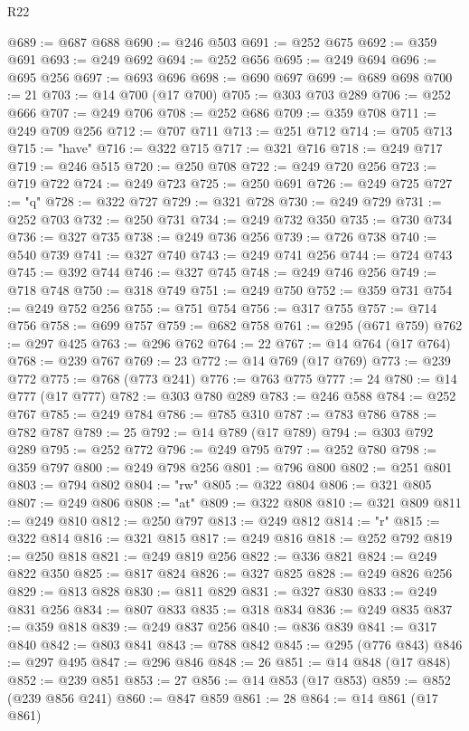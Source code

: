\begin{lexlean}{R22}
\begin{coremodule}
@689 := @687 @688
@690 := @246 @503
@691 := @252 @675
@692 := @359 @691
@693 := @249 @692
@694 := @252 @656
@695 := @249 @694
@696 := @695 @256
@697 := @693 @696
@698 := @690 @697
@699 := @689 @698
@700 := 21
@703 := @14 @700 (@17 @700)
@705 := @303 @703 @289
@706 := @252 @666
@707 := @249 @706
@708 := @252 @686
@709 := @359 @708
@711 := @249 @709 @256
@712 := @707 @711
@713 := @251 @712
@714 := @705 @713
@715 := "have"
@716 := @322 @715
@717 := @321 @716
@718 := @249 @717
@719 := @246 @515
@720 := @250 @708
@722 := @249 @720 @256
@723 := @719 @722
@724 := @249 @723
@725 := @250 @691
@726 := @249 @725
@727 := "q"
@728 := @322 @727
@729 := @321 @728
@730 := @249 @729
@731 := @252 @703
@732 := @250 @731
@734 := @249 @732 @350
@735 := @730 @734
@736 := @327 @735
@738 := @249 @736 @256
@739 := @726 @738
@740 := @540 @739
@741 := @327 @740
@743 := @249 @741 @256
@744 := @724 @743
@745 := @392 @744
@746 := @327 @745
@748 := @249 @746 @256
@749 := @718 @748
@750 := @318 @749
@751 := @249 @750
@752 := @359 @731
@754 := @249 @752 @256
@755 := @751 @754
@756 := @317 @755
@757 := @714 @756
@758 := @699 @757
@759 := @682 @758
@761 := @295 (@671 @759)
@762 := @297 @425
@763 := @296 @762
@764 := 22
@767 := @14 @764 (@17 @764)
@768 := @239 @767
@769 := 23
@772 := @14 @769 (@17 @769)
@773 := @239 @772
@775 := @768 (@773 @241)
@776 := @763 @775
@777 := 24
@780 := @14 @777 (@17 @777)
@782 := @303 @780 @289
@783 := @246 @588
@784 := @252 @767
@785 := @249 @784
@786 := @785 @310
@787 := @783 @786
@788 := @782 @787
@789 := 25
@792 := @14 @789 (@17 @789)
@794 := @303 @792 @289
@795 := @252 @772
@796 := @249 @795
@797 := @252 @780
@798 := @359 @797
@800 := @249 @798 @256
@801 := @796 @800
@802 := @251 @801
@803 := @794 @802
@804 := "rw"
@805 := @322 @804
@806 := @321 @805
@807 := @249 @806
@808 := "at"
@809 := @322 @808
@810 := @321 @809
@811 := @249 @810
@812 := @250 @797
@813 := @249 @812
@814 := "r"
@815 := @322 @814
@816 := @321 @815
@817 := @249 @816
@818 := @252 @792
@819 := @250 @818
@821 := @249 @819 @256
@822 := @336 @821
@824 := @249 @822 @350
@825 := @817 @824
@826 := @327 @825
@828 := @249 @826 @256
@829 := @813 @828
@830 := @811 @829
@831 := @327 @830
@833 := @249 @831 @256
@834 := @807 @833
@835 := @318 @834
@836 := @249 @835
@837 := @359 @818
@839 := @249 @837 @256
@840 := @836 @839
@841 := @317 @840
@842 := @803 @841
@843 := @788 @842
@845 := @295 (@776 @843)
@846 := @297 @495
@847 := @296 @846
@848 := 26
@851 := @14 @848 (@17 @848)
@852 := @239 @851
@853 := 27
@856 := @14 @853 (@17 @853)
@859 := @852 (@239 @856 @241)
@860 := @847 @859
@861 := 28
@864 := @14 @861 (@17 @861)

\end{coremodule}
\end{lexlean}
